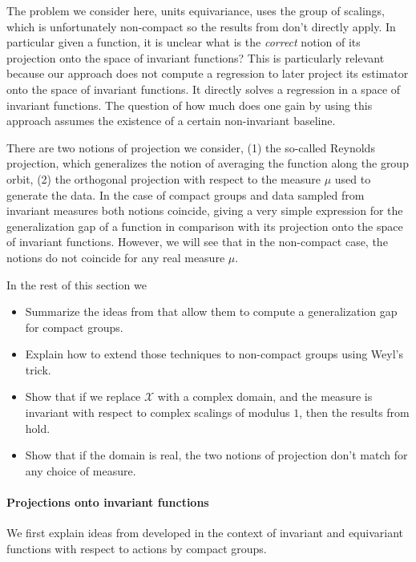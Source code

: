 \documentclass[twoside,11pt]{article}
\begin{document}
The problem we consider here, units equivariance, uses the group of scalings, which is unfortunately non-compact so the results from \citet{elesedy2021provably} don't directly apply. In particular given a function, it is unclear what is the \emph{correct} notion of its projection onto the space of invariant functions? This is particularly relevant because our approach does not compute a regression to later project its estimator onto the space of invariant functions. It directly solves a regression in a space of invariant functions. The question of how much does one gain by using this approach assumes the existence of a certain non-invariant baseline.

There are two notions of projection we consider, (1) the so-called Reynolds projection, which generalizes the notion of averaging the function along the group orbit, (2) the orthogonal projection with respect to the measure $\mu$ used to generate the data.
In the case of compact groups and data sampled from invariant measures both notions coincide, giving a very simple expression for the generalization gap of a function in comparison with its projection onto the space of invariant functions. However, we will see that in the non-compact case, the notions do not coincide for any real measure $\mu$.


In the rest of this section we
\begin{itemize}
\item Summarize the ideas from \citet{elesedy2021provably} that allow them to compute a generalization gap for compact groups.
\item Explain how to extend those techniques to non-compact groups using Weyl's trick.
\item Show that if we replace $\mathcal X$ with a complex domain, and the measure is invariant with respect to complex scalings of modulus $1$, then the results from \citet{elesedy2021provably} hold.
\item Show that if the domain is real, the two notions of projection don't match for any choice of measure.
\end{itemize}


\paragraph{Projections onto invariant functions}
We first explain ideas from \citet{elesedy2021provably} developed in the context of invariant and equivariant functions with respect to actions by compact groups.
\end{document}
